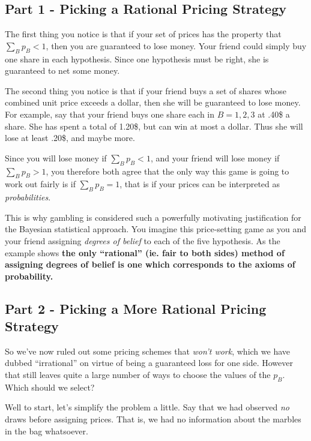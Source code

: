 \documentclass[
]{article}
\begin{document}
\hypertarget{part-1---picking-a-rational-pricing-strategy}{%
\subsection{Part 1 - Picking a Rational Pricing
Strategy}\label{part-1---picking-a-rational-pricing-strategy}}

The first thing you notice is that if your set of prices has the
property that \(\sum_B p_B < 1\), then you are guaranteed to lose money.
Your friend could simply buy one share in each hypothesis. Since one
hypothesis must be right, she is guaranteed to net some money.

The second thing you notice is that if your friend buys a set of shares
whose combined unit price exceeds a dollar, then she will be guaranteed
to lose money. For example, say that your friend buys one share each in
\(B=1,2,3\) at .40\$ a share. She has spent a total of 1.20\$, but can
win at most a dollar. Thus she will lose at least .20\$, and maybe more.

Since you will lose money if \(\sum_B p_B < 1\), and your friend will
lose money if \(\sum_B p_B> 1\), you therefore both agree that the only
way this game is going to work out fairly is if \(\sum_B p_B = 1\), that
is if your prices can be interpreted as \emph{probabilities}.

This is why gambling is considered such a powerfully motivating
justification for the Bayesian statistical approach. You imagine this
price-setting game as you and your friend assigning \emph{degrees of
belief} to each of the five hypothesis. As the example shows \textbf{the
only ``rational'' (ie. fair to both sides) method of assigning degrees
of belief is one which corresponds to the axioms of probability.}

\hypertarget{part-2---picking-a-more-rational-pricing-strategy}{%
\subsection{Part 2 - Picking a More Rational Pricing
Strategy}\label{part-2---picking-a-more-rational-pricing-strategy}}

So we've now ruled out some pricing schemes that \emph{won't work},
which we have dubbed ``irrational'' on virtue of being a guaranteed loss
for one side. However that still leaves quite a large number of ways to
choose the values of the \(p_B\). Which should we select?

Well to start, let's simplify the problem a little. Say that we had
observed \emph{no} draws before assigning prices. That is, we had no
information about the marbles in the bag whatsoever.
\end{document}
